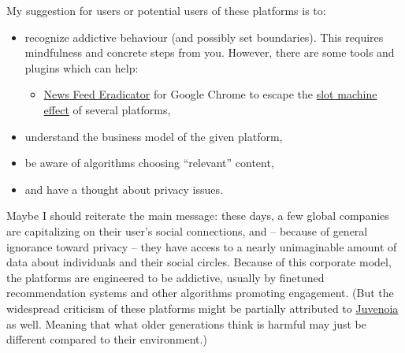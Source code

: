 \documentclass{article}
\begin{document}
My suggestion for users or potential users of these platforms is to:
\begin{itemize}
    \item recognize addictive behaviour (and possibly set boundaries). This requires mindfulness and concrete steps from you. However, there are some tools and plugins which can help:
    \begin{itemize}
        \item \href{https://chromewebstore.google.com/detail/news-feed-eradicator/fjcldmjmjhkklehbacihaiopjklihlgg?hl=en}{News Feed Eradicator} for Google Chrome to escape the \href{https://www.theguardian.com/technology/2018/may/08/social-media-copies-gambling-methods-to-create-psychological-cravings}{slot machine effect} of several platforms,
    \end{itemize}
    \item understand the business model of the given platform,
    \item be aware of algorithms choosing ``relevant'' content,
    \item and have a thought about privacy issues.
\end{itemize}

Maybe I should reiterate the main message: these days, a few global companies are capitalizing on their user's social connections, and – because of general ignorance toward privacy – they have access to a nearly unimaginable amount of data about individuals and their social circles. Because of this corporate model, the platforms are engineered to be addictive, usually by finetuned recommendation systems and other algorithms promoting engagement. (But the widespread criticism of these platforms might be partially attributed to \href{https://www.youtube.com/watch?v=LD0x7ho_IYc}{Juvenoia} as well. Meaning that what older generations think is harmful may just be different compared to their environment.)
\end{document}

